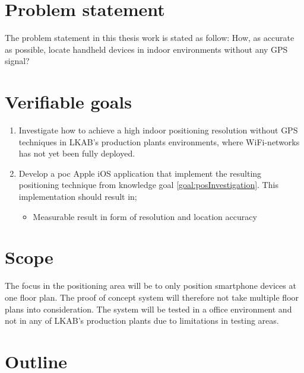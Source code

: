 \section{Problem statement}\label{sec:introProblemStatement}
The problem statement in this thesis work is stated as follow: How, as accurate as possible, locate handheld devices in indoor environments without any GPS signal?


\section{Verifiable goals}\label{sec:introGoals}
\begin{enumerate}
\item \label{goal:posInvestigation}
Investigate how to achieve a high indoor positioning resolution without GPS
techniques in LKAB's production plants environments, where WiFi-networks has
not yet been fully deployed.

\item \label{goal:poc}
Develop a \acrfull{poc} Apple iOS application that implement the resulting
positioning technique from knowledge goal \ref{goal:posInvestigation}. This
implementation should result in;
\begin{itemize}
\item Measurable result in form of resolution and location accuracy
\end{itemize}
\end{enumerate}


\section{Scope}
The focus in the positioning area will be to only position smartphone devices at one floor plan.
The proof of concept system will therefore not take multiple floor plans into consideration.
The system will be tested in a office environment and not in any of LKAB's production plants due to
limitations in testing areas.


\section{Outline}
